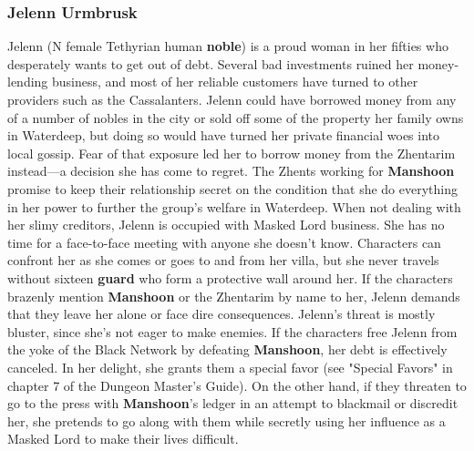 \documentclass[10pt,a4paper,twoside,twocolumn,openany,nodeprecatedcode]{dndbook}
\begin{document}
\subsubsection{Jelenn Urmbrusk}
Jelenn (N female Tethyrian human \textbf{noble}) is a proud woman in her fifties who desperately wants to get out of debt. Several bad investments ruined her money-lending business, and most of her reliable customers have turned to other providers such as the Cassalanters. Jelenn could have borrowed money from any of a number of nobles in the city or sold off some of the property her family owns in Waterdeep, but doing so would have turned her private financial woes into local gossip. Fear of that exposure led her to borrow money from the Zhentarim instead—a decision she has come to regret. The Zhents working for \textbf{Manshoon} promise to keep their relationship secret on the condition that she do everything in her power to further the group's welfare in Waterdeep.
When not dealing with her slimy creditors, Jelenn is occupied with Masked Lord business. She has no time for a face-to-face meeting with anyone she doesn't know. Characters can confront her as she comes or goes to and from her villa, but she never travels without sixteen \textbf{guard} who form a protective wall around her. If the characters brazenly mention \textbf{Manshoon} or the Zhentarim by name to her, Jelenn demands that they leave her alone or face dire consequences. Jelenn's threat is mostly bluster, since she's not eager to make enemies.
If the characters free Jelenn from the yoke of the Black Network by defeating \textbf{Manshoon}, her debt is effectively canceled. In her delight, she grants them a special favor (see "Special Favors" in chapter 7 of the Dungeon Master's Guide). On the other hand, if they threaten to go to the press with \textbf{Manshoon}'s ledger in an attempt to blackmail or discredit her, she pretends to go along with them while secretly using her influence as a Masked Lord to make their lives difficult.
\end{document}
